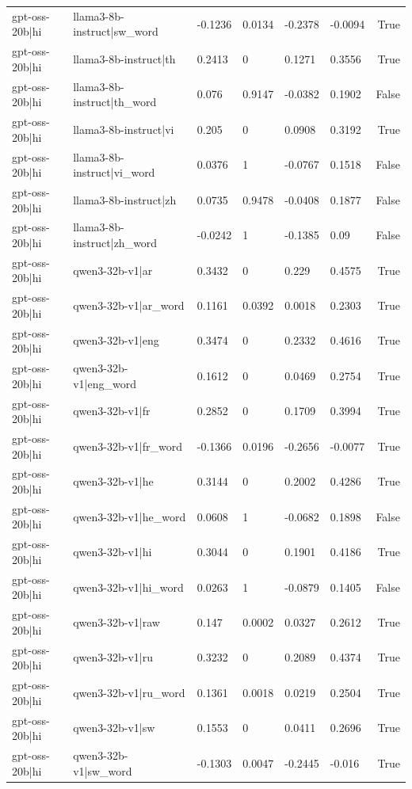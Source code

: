 \begin{table}
\begin{tabular}{llllllr}
gpt-oss-20b|hi & llama3-8b-instruct|sw_word & -0.1236 & 0.0134 & -0.2378 & -0.0094 & True \\
gpt-oss-20b|hi & llama3-8b-instruct|th & 0.2413 & 0 & 0.1271 & 0.3556 & True \\
gpt-oss-20b|hi & llama3-8b-instruct|th_word & 0.076 & 0.9147 & -0.0382 & 0.1902 & False \\
gpt-oss-20b|hi & llama3-8b-instruct|vi & 0.205 & 0 & 0.0908 & 0.3192 & True \\
gpt-oss-20b|hi & llama3-8b-instruct|vi_word & 0.0376 & 1 & -0.0767 & 0.1518 & False \\
gpt-oss-20b|hi & llama3-8b-instruct|zh & 0.0735 & 0.9478 & -0.0408 & 0.1877 & False \\
gpt-oss-20b|hi & llama3-8b-instruct|zh_word & -0.0242 & 1 & -0.1385 & 0.09 & False \\
gpt-oss-20b|hi & qwen3-32b-v1|ar & 0.3432 & 0 & 0.229 & 0.4575 & True \\
gpt-oss-20b|hi & qwen3-32b-v1|ar_word & 0.1161 & 0.0392 & 0.0018 & 0.2303 & True \\
gpt-oss-20b|hi & qwen3-32b-v1|eng & 0.3474 & 0 & 0.2332 & 0.4616 & True \\
gpt-oss-20b|hi & qwen3-32b-v1|eng_word & 0.1612 & 0 & 0.0469 & 0.2754 & True \\
gpt-oss-20b|hi & qwen3-32b-v1|fr & 0.2852 & 0 & 0.1709 & 0.3994 & True \\
gpt-oss-20b|hi & qwen3-32b-v1|fr_word & -0.1366 & 0.0196 & -0.2656 & -0.0077 & True \\
gpt-oss-20b|hi & qwen3-32b-v1|he & 0.3144 & 0 & 0.2002 & 0.4286 & True \\
gpt-oss-20b|hi & qwen3-32b-v1|he_word & 0.0608 & 1 & -0.0682 & 0.1898 & False \\
gpt-oss-20b|hi & qwen3-32b-v1|hi & 0.3044 & 0 & 0.1901 & 0.4186 & True \\
gpt-oss-20b|hi & qwen3-32b-v1|hi_word & 0.0263 & 1 & -0.0879 & 0.1405 & False \\
gpt-oss-20b|hi & qwen3-32b-v1|raw & 0.147 & 0.0002 & 0.0327 & 0.2612 & True \\
gpt-oss-20b|hi & qwen3-32b-v1|ru & 0.3232 & 0 & 0.2089 & 0.4374 & True \\
gpt-oss-20b|hi & qwen3-32b-v1|ru_word & 0.1361 & 0.0018 & 0.0219 & 0.2504 & True \\
gpt-oss-20b|hi & qwen3-32b-v1|sw & 0.1553 & 0 & 0.0411 & 0.2696 & True \\
gpt-oss-20b|hi & qwen3-32b-v1|sw_word & -0.1303 & 0.0047 & -0.2445 & -0.016 & True \\

\end{tabular}
\end{table}
